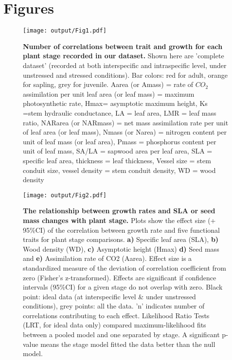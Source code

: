 \documentclass[a4paper]{article}\usepackage[]{graphicx}\usepackage[]{color}
\begin{document}
\clearpage
\linespread{1}

\label{references}

\newpage
\section*{Figures}

\begin{figure}[htbp]
\centering
\texttt{[image: output/Fig1.pdf]}
\caption{\textbf{Number of correlations between trait and growth for each plant stage recorded in our dataset.} Shown here are 'complete dataset' (recorded at both interspecific and intraspecific level, under unstressed and stressed conditions). Bar colors: red for adult, orange for sapling, grey for juvenile. Aarea (or Amass) = rate of $CO_{2}$ assimilation per unit leaf area (or leaf mass) = maximum photosynthetic rate, Hmax= asymptotic maximum height,  Ks =stem hydraulic conductance, LA = leaf area, LMR = leaf mass ratio, NARarea (or NARmass) = net mass assimilation rate per unit of leaf area (or leaf mass), Nmass (or Narea) = nitrogen content per unit of leaf mass (or leaf area), Pmass = phosphorus content per unit of leaf mass, SA/LA = sapwood area per leaf area, SLA = specific leaf area, thickness = leaf thickness, Vessel size = stem conduit size, vessel density = stem conduit density, WD = wood density}
\label{Fig1}
\end{figure}


\begin{figure}[htbp]
\centering
\texttt{[image: output/Fig2.pdf]}
\caption{\textbf{The relationship between growth rates and SLA or seed mass changes with plant stage.} Plots show the effect size (+ 95\%CI) of the correlation between growth rate and five functional traits for plant stage comparisons. \textbf{a)} Specific leaf area (SLA), \textbf{b)} Wood density (WD), \textbf{c)} Asymptotic height (Hmax) \textbf{d)} Seed mass and \textbf{e)} Assimilation rate of CO2 (Aarea). Effect size is a standardized measure of the deviation of correlation coefficient from zero (Fisher's z-transformed). Effects are significant if confidence intervals (95\%CI) for a given stage do not overlap with zero. Black point: ideal data (at interspecific level \& under unstressed conditions), grey points: all the data. 'n' indicates number of correlations contributing to each effect. Likelihood Ratio Tests (LRT, for ideal data only) compared maximum-likelihood fits between a pooled model and one separated by stage. A significant p-value means the stage model fitted the data better than the null model.
}
\label{Fig2}



\end{figure}
\end{document}
